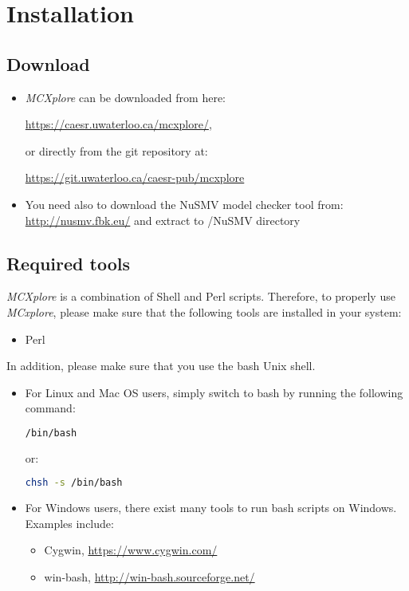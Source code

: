 \section{Installation}

\subsection{Download} 

\begin{itemize}
\item

\textit{MCXplore} can be downloaded from here:

\url{https://caesr.uwaterloo.ca/mcxplore/},

 or directly from the git repository at:


\url{https://git.uwaterloo.ca/caesr-pub/mcxplore} 

\item 

You need also to download the NuSMV model checker tool from: 
\url{http://nusmv.fbk.eu/} and extract to /NuSMV directory
\end{itemize}
\subsection{Required tools}
\textit{MCXplore} is a combination of Shell and Perl scripts. 
Therefore, to properly use \textit{MCxplore}, please make sure that the following tools are installed in your system:
\begin{itemize}
\item Perl
\end{itemize} 

In addition, please make sure that you use the bash Unix shell. 



\begin{itemize}
\item For Linux and Mac OS users, simply switch to bash by running the following command:

\begin{lstlisting}[language=bash]
/bin/bash
\end{lstlisting}

or:

\begin{lstlisting}[language=bash]
chsh -s /bin/bash
\end{lstlisting}

\item For Windows users, there exist many tools to run bash scripts on Windows. 
Examples include: 

\begin{itemize}
\item Cygwin, \url{https://www.cygwin.com/}

\item win-bash, \url{http://win-bash.sourceforge.net/}
\end{itemize}

\end{itemize} 




